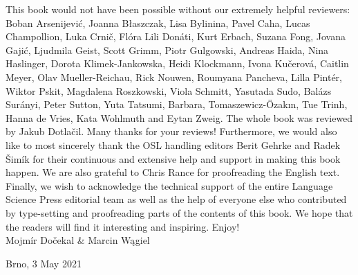 \documentclass[output=paper]{langscibook}
\begin{document}
This book would not have been possible without our extremely helpful reviewers: Boban Arsenijević, Joanna Błaszczak, Lisa Bylinina, Pavel Caha, Lucas Champollion, Luka Crnič, Flóra Lili Donáti, Kurt Erbach, Suzana Fong, Jovana Gajić, Ljudmila Geist, Scott Grimm, Piotr Gulgowski, Andreas Haida, Nina Haslinger, Dorota Klimek-Jankowska, Heidi Klockmann, Ivona Kučerová, Caitlin Meyer, Olav Mueller-Reichau, Rick Nouwen, Roumyana Pancheva, Lilla Pintér, Wiktor Pskit, Magdalena Roszkowski, Viola Schmitt, Yasutada Sudo, Balázs Surányi, Peter Sutton, Yuta Tatsumi, Barbara, Tomaszewicz-Özakın, Tue Trinh, Hanna de Vries, Kata Wohlmuth and Eytan Zweig. The whole book was reviewed by Jakub Dotlačil. Many thanks for your reviews! Furthermore, we would also like to most sincerely thank the OSL handling editors Berit Gehrke and Radek Šimík for their continuous and extensive help and support in making this book happen. We are also grateful to Chris Rance for proofreading the English text. Finally, we wish to acknowledge the technical support of the entire Language Science Press editorial team as well as the help of everyone else who contributed by type-setting and proofreading parts of the contents of this book. We hope that the readers will find it interesting and inspiring. Enjoy!\bigskip\\

\hfill Mojmír Dočekal \& Marcin Wągiel

\hfill Brno, 3 May 2021

{\sloppy\printbibliography[heading=subbibliography,notkeyword=this]}
\end{document}
